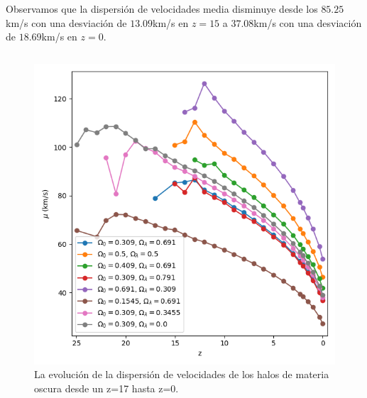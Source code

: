 \documentclass{beamer}
\begin{document}
	\begin{frame}
		\small Observamos que la dispersión de velocidades media disminuye desde los $85.25$km/s con una desviación de $13.09$km/s en $z=15$ a $37.08$km/s con una desviación de $18.69$km/s en $z=0$.
		
		\begin{columns}[t]
			\begin{column}{.5\textwidth}
				\begin{figure}
					\centering
					\includegraphics[scale=0.3]{Conc/VelDisp_Mean_Conc.png}
					\caption{\footnotesize La evolución de la dispersión de velocidades de los halos de materia oscura desde un z=17 hasta z=0.}
					\label{fig:Conc-VelDispMean}
				\end{figure}
			\end{column}


\end{columns}
\end{frame}
\end{document}

